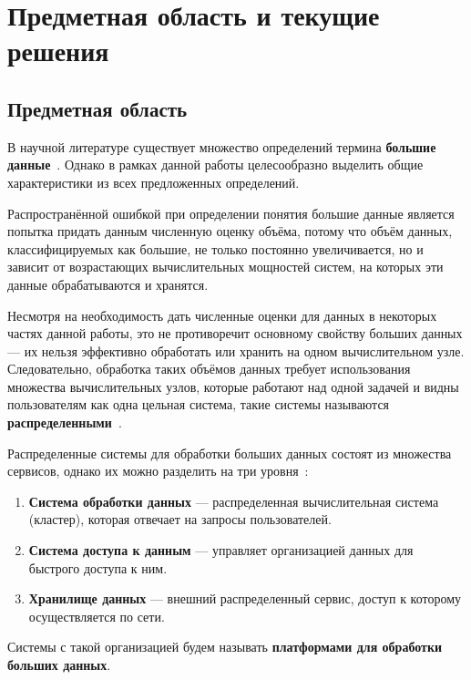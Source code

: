 \section{Предметная область и текущие решения}
\subsection{Предметная область}\label{subsec:definition}

В научной литературе существует множество определений термина \textbf{большие данные}~\cite{Bigdata_a_review, Bigdata_an_introduction, Challenges_of_big_data_analysis}. Однако в рамках данной работы целесообразно выделить общие характеристики из всех предложенных определений. 

Распространённой ошибкой при определении понятия большие данные является попытка придать данным численную оценку объёма, потому что объём данных, классифицируемых как большие, не только постоянно увеличивается, но и зависит от возрастающих вычислительных мощностей систем, на которых эти данные обрабатываются и хранятся. 

Несмотря на необходимость дать численные оценки для данных в некоторых частях данной работы, это не противоречит основному свойству больших данных --- их нельзя эффективно обработать или хранить на одном вычислительном узле. Следовательно, обработка таких объёмов данных требует использования множества вычислительных узлов, которые работают над одной задачей и видны пользователям как одна цельная система, такие системы называются \textbf{распределенными}~\cite{Time_clocks_and_the_ordering_of_events_in_a_distributed_system}.

Распределенные системы для обработки больших данных состоят из множества сервисов, однако их можно разделить на три уровня~\cite{Spatial_big_data_architecture}:
\begin{enumerate}
    \item \textbf{Система обработки данных} --- распределенная вычислительная система (кластер), которая отвечает на запросы пользователей.
    \item \textbf{Система доступа к данным} --- управляет организацией данных для быстрого доступа к ним.
    \item \textbf{Хранилище данных} --- внешний распределенный сервис, доступ к которому осуществляется по сети.
\end{enumerate}
Системы с такой организацией будем называть \textbf{платформами для обработки больших данных}.

